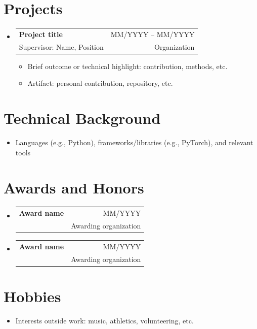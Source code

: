 \documentclass[letterpaper,11pt]{article}
\makeatletter
\newcommand{\cvitem}[1]{
  \item\small{
    {#1\vspace{-2pt}}
  }
}
\newcommand{\cvheading}[4]{
  \vspace{-2pt}\item
    \begin{tabular*}{\textwidth}[t]{l@{\extracolsep{\fill}}r}
      \textbf{#1} & #2 \\
      \small#3 & \small #4 \\
    \end{tabular*}\vspace{-7pt}
}
\newcommand{\cvheadingstart}{\begin{itemize}[leftmargin=0in, label={}]}
\newcommand{\cvheadingend}{\end{itemize}}
\newcommand{\cvitemstart}{\begin{itemize}[label=\textopenbullet]\justifying}
\newcommand{\cvitemend}{\end{itemize}\vspace{-5pt}}
\makeatother
\begin{document}
\section{Projects}
\cvheadingstart
  \cvheading
    {Project title}{MM/YYYY -- MM/YYYY}
    {Supervisor: Name, Position}{Organization}
  \cvitemstart
    \cvitem{Brief outcome or technical highlight: contribution, methods, etc.}
    \cvitem{Artifact: personal contribution, repository, etc.}
  \cvitemend
\cvheadingend


\section{Technical Background}
\begin{itemize}
  \setlength{\itemsep}{0pt}
  \item Languages (e.g., Python), frameworks/libraries (e.g., PyTorch), and relevant tools
\end{itemize}


\section{Awards and Honors}
\cvheadingstart
  \cvheading
    {Award name}{MM/YYYY}
    {}{Awarding organization}
\cvheadingend

\cvheadingstart
  \cvheading
    {Award name}{MM/YYYY}
    {}{Awarding organization}
\cvheadingend


\section{Hobbies}
\begin{itemize}
    \item Interests outside work: music, athletics, volunteering, etc.
\end{itemize}
\end{document}
